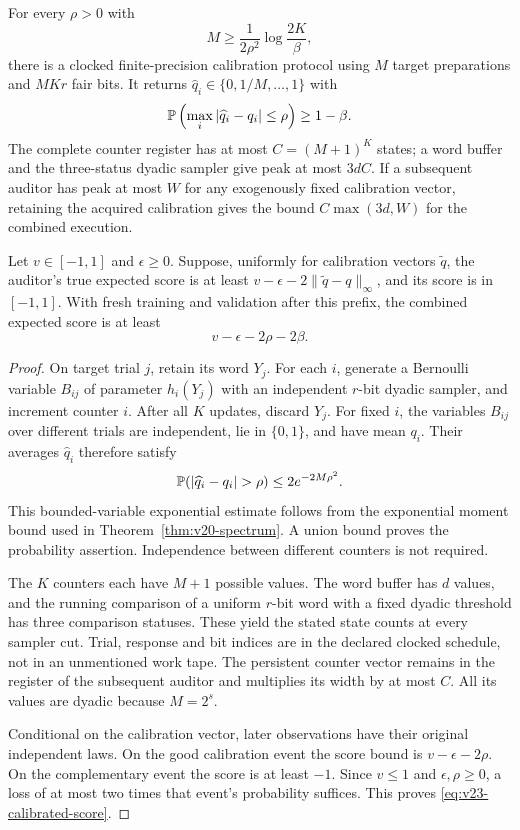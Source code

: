 \begin{theorem}
\label{thm:v23-calibration}
For every $\rho>0$ with
\begin{equation}\label{eq:v23-calibration-samples}
 M\ge\frac{1}{2\rho^2}\log\frac{2K}{\beta},
\end{equation}
there is a clocked finite-precision calibration protocol using $M$
target preparations and $MKr$ fair bits. It returns
$\widehat q_i\in\{0,1/M,\ldots,1\}$ with
\[
 \mathbb P\left(\max_i|\widehat q_i-q_i|\le\rho\right)\ge1-\beta.
\]
The complete counter register has at most $C=(M+1)^K$ states; a word
buffer and the three-status dyadic sampler give peak at most $3dC$.
If a subsequent auditor has peak at most $W$ for any exogenously fixed
calibration vector, retaining the acquired calibration gives the bound
$C\max(3d,W)$ for the combined execution.

Let $v\in[-1,1]$ and $\epsilon\ge0$. Suppose, uniformly for calibration vectors $\widetilde q$, the auditor's
true expected score is at least
$v-\epsilon-2\|\widetilde q-q\|_\infty$, and its score is in $[-1,1]$.
With fresh training and validation after this prefix, the combined
expected score is at least
\begin{equation}\label{eq:v23-calibrated-score}
 v-\epsilon-2\rho-2\beta.
\end{equation}
\end{theorem}
\begin{proof}
On target trial $j$, retain its word $Y_j$. For each $i$, generate a
Bernoulli variable $B_{ij}$ of parameter $h_i(Y_j)$ with an independent
$r$-bit dyadic sampler, and increment counter $i$. After all $K$ updates,
discard $Y_j$. For fixed $i$, the variables $B_{ij}$ over different
trials are independent, lie in $\{0,1\}$, and have mean $q_i$. Their
averages $\widehat q_i$ therefore satisfy
\[
 \Pp(|\widehat q_i-q_i|>\rho)\le2e^{-2M\rho^2}.
\]
This bounded-variable exponential estimate follows from the exponential
moment bound used in Theorem~\ref{thm:v20-spectrum}. A union bound
proves the probability assertion. Independence between different
counters is not required.

The $K$ counters each have $M+1$ possible values. The word buffer has
$d$ values, and the running comparison of a uniform $r$-bit word with
a fixed dyadic threshold has three comparison statuses. These yield
the stated state counts at every sampler cut. Trial, response and bit
indices are in the declared clocked schedule, not in an unmentioned
work tape. The persistent counter vector remains in the register of
the subsequent auditor and multiplies its width by at most $C$.
All its values are dyadic because $M=2^s$.

Conditional on the calibration vector, later observations have their
original independent laws. On the good calibration event the score
bound is $v-\epsilon-2\rho$. On the complementary event the score is
at least $-1$. Since $v\le1$ and $\epsilon,\rho\ge0$, a loss of at
most two times that event's probability suffices. This proves
\eqref{eq:v23-calibrated-score}.
\end{proof}

